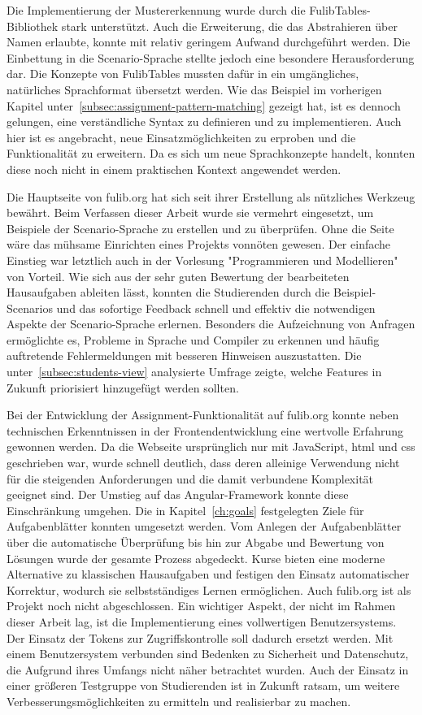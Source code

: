 Die Implementierung der Mustererkennung wurde durch die FulibTables-Bibliothek stark unterstützt.
Auch die Erweiterung, die das Abstrahieren über Namen erlaubte, konnte mit relativ geringem Aufwand durchgeführt werden.
Die Einbettung in die Scenario-Sprache stellte jedoch eine besondere Herausforderung dar.
Die Konzepte von FulibTables mussten dafür in ein umgängliches, natürliches Sprachformat übersetzt werden.
Wie das Beispiel im vorherigen Kapitel unter~\ref{subsec:assignment-pattern-matching} gezeigt hat, ist es dennoch gelungen, eine verständliche Syntax zu definieren und zu implementieren.
Auch hier ist es angebracht, neue Einsatzmöglichkeiten zu erproben und die Funktionalität zu erweitern.
Da es sich um neue Sprachkonzepte handelt, konnten diese noch nicht in einem praktischen Kontext angewendet werden.

Die Hauptseite von fulib.org hat sich seit ihrer Erstellung als nützliches Werkzeug bewährt.
Beim Verfassen dieser Arbeit wurde sie vermehrt eingesetzt, um Beispiele der Scenario-Sprache zu erstellen und zu überprüfen.
Ohne die Seite wäre das mühsame Einrichten eines Projekts vonnöten gewesen.
Der einfache Einstieg war letztlich auch in der Vorlesung "Programmieren und Modellieren" von Vorteil.
Wie sich aus der sehr guten Bewertung der bearbeiteten Hausaufgaben ableiten lässt, konnten die Studierenden durch die Beispiel-Scenarios und das sofortige Feedback schnell und effektiv die notwendigen Aspekte der Scenario-Sprache erlernen.
Besonders die Aufzeichnung von Anfragen ermöglichte es, Probleme in Sprache und Compiler zu erkennen und häufig auftretende Fehlermeldungen mit besseren Hinweisen auszustatten.
Die unter~\ref{subsec:students-view} analysierte Umfrage zeigte, welche Features in Zukunft priorisiert hinzugefügt werden sollten.

Bei der Entwicklung der Assignment-Funktionalität auf fulib.org konnte neben technischen Erkenntnissen in der Frontendentwicklung eine wertvolle Erfahrung gewonnen werden.
Da die Webseite ursprünglich nur mit JavaScript, \ac{html} und \ac{css} geschrieben war, wurde schnell deutlich, dass deren alleinige Verwendung nicht für die steigenden Anforderungen und die damit verbundene Komplexität geeignet sind.
Der Umstieg auf das Angular-Framework konnte diese Einschränkung umgehen.
Die in Kapitel~\ref{ch:goals} festgelegten Ziele für Aufgabenblätter konnten umgesetzt werden.
Vom Anlegen der Aufgabenblätter über die automatische Überprüfung bis hin zur Abgabe und Bewertung von Lösungen wurde der gesamte Prozess abgedeckt.
Kurse bieten eine moderne Alternative zu klassischen Hausaufgaben und festigen den Einsatz automatischer Korrektur, wodurch sie selbstständiges Lernen ermöglichen.
Auch fulib.org ist als Projekt noch nicht abgeschlossen.
Ein wichtiger Aspekt, der nicht im Rahmen dieser Arbeit lag, ist die Implementierung eines vollwertigen Benutzersystems.
Der Einsatz der Tokens zur Zugriffskontrolle soll dadurch ersetzt werden.
Mit einem Benutzersystem verbunden sind Bedenken zu Sicherheit und Datenschutz, die Aufgrund ihres Umfangs nicht näher betrachtet wurden.
Auch der Einsatz in einer größeren Testgruppe von Studierenden ist in Zukunft ratsam, um weitere Verbesserungsmöglichkeiten zu ermitteln und realisierbar zu machen.
